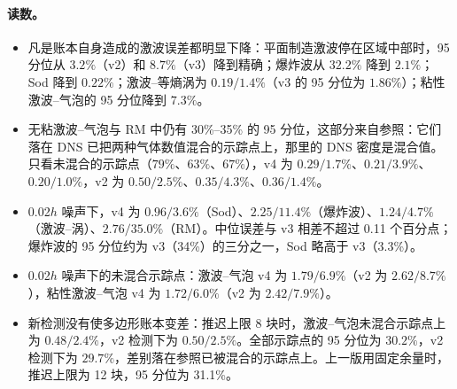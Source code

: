 \paragraph{读数。}
\begin{itemize}
\item 凡是账本自身造成的激波误差都明显下降：平面制造激波停在区域中部时，95 分位从 $3.2\%$（v2）和 $8.7\%$（v3）降到精确；爆炸波从 $32.2\%$ 降到 $2.1\%$；Sod 降到 $0.22\%$；激波–等熵涡为 $0.19 / 1.4\%$（v3 的 95 分位为 $1.86\%$）；粘性激波–气泡的 95 分位降到 $7.3\%$。
\item 无粘激波–气泡与 RM 中仍有 30\%–35\% 的 95 分位，这部分来自参照：它们落在 DNS 已把两种气体数值混合的示踪点上，那里的 DNS 密度是混合值。只看未混合的示踪点（$79\%$、$63\%$、$67\%$），v4 为 $0.29 / 1.7\%$、$0.21 / 3.9\%$、$0.20 / 1.0\%$，v2 为 $0.50 / 2.5\%$、$0.35 / 4.3\%$、$0.36 / 1.4\%$。
\item 0.02$h$ 噪声下，v4 为 $0.96 / 3.6\%$（Sod）、$2.25 / 11.4\%$（爆炸波）、$1.24 / 4.7\%$（激波–涡）、$2.76 / 35.0\%$（RM）。中位误差与 v3 相差不超过 0.11 个百分点；爆炸波的 95 分位约为 v3（34\%）的三分之一，Sod 略高于 v3（3.3\%）。
\item 0.02$h$ 噪声下的未混合示踪点：激波–气泡 v4 为 $1.79 / 6.9\%$（v2 为 $2.62 / 8.7\%$），粘性激波–气泡 v4 为 $1.72 / 6.0\%$（v2 为 $2.42 / 7.9\%$）。
\item 新检测没有使多边形账本变差：推迟上限 $8$ 块时，激波–气泡未混合示踪点上为 $0.48 / 2.4\%$，v2 检测下为 $0.50 / 2.5\%$。全部示踪点的 95 分位为 $30.2\%$，v2 检测下为 $29.7\%$，差别落在参照已被混合的示踪点上。上一版用固定余量时，推迟上限为 12 块，95 分位为 31.1\%。
\end{itemize}

